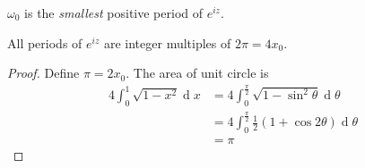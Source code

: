 \documentclass[12pt]{article}
\renewcommand{\d}{\ensuremath{\operatorname{d}}}
\begin{document}
\begin{proposition}
    $\omega_0$ is the \textit{smallest} positive period of $e^{iz}$.
\end{proposition}

\begin{proposition}
    All periods of $e^{iz}$ are integer multiples of $2\pi=4x_0$.
\end{proposition}

\begin{proof}
    Define $\pi=2x_0$. The area of unit circle is \begin{align*}
        4\int_{0}^{1}\sqrt{1-x^2}\d x &= 4\int_{0}^{\frac{\pi}{2}}\sqrt{1-\sin^2 \theta}\d \theta\\
        &= 4\int_{0}^{\frac{\pi}{2}}\frac{1}{2}(1+\cos 2\theta)\d \theta\\
        &= \pi
    \end{align*}
\end{proof}
\end{document}
